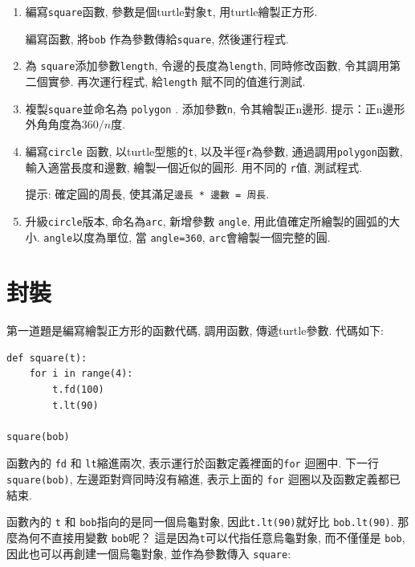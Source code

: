 \documentclass[10pt]{book}
\begin{document}
\begin{enumerate}

\item 編寫{\tt square}函數, 參數是個turtle對象{\tt t}, 用turtle繪製正方形. 

編寫函數, 將{\tt bob} 作為參數傳給{\tt square}, 然後運行程式. 

\item 為 {\tt square}添加參數{\tt length}, 令邊的長度為{\tt length}, 
同時修改函數, 令其調用第二個實參. 再次運行程式, 給{\tt length} 賦不同的值進行測試. 

\item 複製{\tt square}並命名為 {\tt polygon} . 添加參數{\tt n},
令其繪製正n邊形. 提示：正n邊形外角角度為$360/n$度. 

\item 編寫{\tt circle} 函數, 以turtle型態的{\tt t}, 以及半徑{\tt r}為參數, 
通過調用{\tt polygon}函數, 輸入適當長度和邊數, 繪製一個近似的圓形. 
用不同的 {\tt r}值, 測試程式.  

提示: 確定圓的周長, 使其滿足{\tt 邊長 * 邊數 = 周長}.

\item 升級{\tt circle}版本, 命名為{\tt arc}, 新增參數 {\tt angle}, 
用此值確定所繪製的圓弧的大小. 
 {\tt angle}以度為單位, 當 {\tt angle=360}, {\tt arc}會繪製一個完整的圓. 

\end{enumerate}


\section{封裝}

第一道題是編寫繪製正方形的函數代碼, 調用函數, 傳遞turtle參數. 
代碼如下:

\begin{verbatim}
def square(t):
    for i in range(4):
        t.fd(100)
        t.lt(90)

square(bob)
\end{verbatim}
%
函數內的 {\tt fd} 和 {\tt lt}縮進兩次, 表示運行於函數定義裡面的{\tt for} 迴圈中. 
下一行 {\tt square(bob)}, 左邊距對齊同時沒有縮進, 
表示上面的 {\tt for} 迴圈以及函數定義都已結束. 

函數內的 {\tt t} 和 {\tt bob}指向的是同一個烏龜對象, 
因此{\tt t.lt(90)}就好比 {\tt bob.lt(90)}. 
那麼為何不直接用變數 {\tt bob}呢？
這是因為{\tt t}可以代指任意烏龜對象, 而不僅僅是 {\tt bob}, 
因此也可以再創建一個烏龜對象, 並作為參數傳入 {\tt square}:
\end{document}
